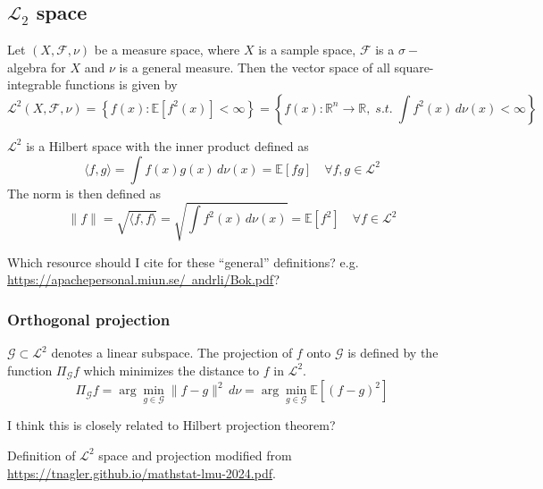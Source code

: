 \subsection{$\mathcal{L}_2$ space}
Let $(X, \mathcal{F}, \nu)$ be a measure space, where $X$ is a sample space, $\mathcal{F}$ is a $\sigma-$algebra for $X$ and $\nu$ is a general measure. Then the vector space of all square-integrable functions is given by
\[
\mathcal{L}^2(X, \mathcal{F}, \nu) = \left\{ f(x) : \mathbb{E}[f^2(x)] < \infty \right\}
= \left\{ f(x) : \mathbb{R}^{n} \to \mathbb{R}, \; \textit{s.t.} \; \int f^2(x)\, d\nu(x) < \infty \right\}
\]

$\mathcal{L}^2$ is a Hilbert space with the inner product defined as
\[
\langle f, g \rangle = \int f(x) g(x) \, d\nu(x) = \mathbb{E}[fg] \quad \forall f, g \in \mathcal{L}^2
\]
The norm is then defined as
\[
\|f\| = \sqrt{\langle f, f \rangle} = \sqrt{\int f^2(x) \, d\nu(x)} = \mathbb{E}[f^2] \quad \forall f \in \mathcal{L}^2
\]

{\color{blue} Which resource should I cite for these ``general'' definitions? e.g. \href{https://apachepersonal.miun.se/~andrli/Bok.pdf}{https://apachepersonal.miun.se/~andrli/Bok.pdf}?}

\subsubsection*{Orthogonal projection}
$\mathcal{G} \subset \mathcal{L}^2$ denotes a linear subspace. The projection of $f$ onto $\mathcal{G}$ is defined by the function $\Pi_{\mathcal{G}}f$ which minimizes the distance to $f$ in $\mathcal{L}^2$.
\[
\Pi_{\mathcal{G}}f = \arg\min_{g \in \mathcal{G}} \|f - g\|^2 \, d\nu
= \arg\min_{g \in \mathcal{G}} \mathbb{E}[(f - g)^2]
\]

{\color{blue}I think this is closely related to Hilbert projection theorem?}\par
Definition of $\mathcal{L}^2$ space and projection modified from \href{https://tnagler.github.io/mathstat-lmu-2024.pdf}{https://tnagler.github.io/mathstat-lmu-2024.pdf}.


